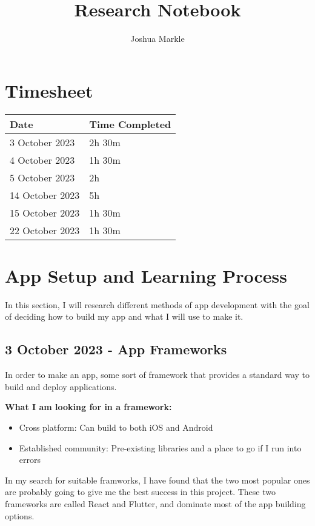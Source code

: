 \documentclass{article}
\title{Research Notebook}
\author{Joshua Markle}
\date{}
\begin{document}
\maketitle

\tableofcontents
\newpage

\section{Timesheet}

\begin{tabular}{|p{3cm}|p{3cm}|}
	\hline
	\textbf{Date} & \textbf{Time Completed} \\ \hline
	3 October 2023 & 2h 30m \\ \hline
	4 October 2023 & 1h 30m \\ \hline
	5 October 2023 & 2h \\ \hline
	14 October 2023 & 5h \\ \hline
	15 October 2023 & 1h 30m \\ \hline
	22 October 2023 & 1h 30m \\ \hline
\end{tabular}
\newpage



\section{App Setup and Learning Process}

In this section, I will research different methods of app development with the goal of deciding how to build my app and what I will use to make it.

\subsection{3 October 2023 - App Frameworks}

In order to make an app, some sort of framework that provides a standard way to build and deploy applications.

\textbf{What I am looking for in a framework:}

\begin{itemize}
				\item Cross platform: Can build to both iOS and Android
				\item Established community: Pre-existing libraries and a place to go if I run into errors
\end{itemize}

In my search for suitable framworks, I have found that the two most popular ones are probably going to give me the best success in this project. These two frameworks are called React and Flutter, and dominate most of the app building options.
\end{document}
